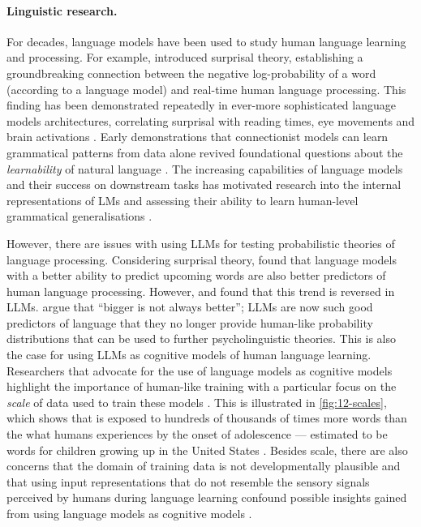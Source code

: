 \paragraph{Linguistic research.} For decades, language models have been used to study human language learning and processing. For example, \citet{hale-2001-probabilistic} introduced surprisal theory, establishing a groundbreaking connection between the negative log-probability of a word (according to a language model) and real-time human language processing. This finding has been demonstrated repeatedly in ever-more sophisticated language models architectures, correlating surprisal with reading times, eye movements and brain activations \citep[e.g.][]{levy2008expectation, futrell2019neural, futrell2020lossy, schrimpf2021neural}. Early demonstrations that connectionist models can learn grammatical patterns from data alone \citep[e.g.,][]{elman1990finding, macdonald1994lexical} revived foundational questions about the \emph{learnability} of natural language \citep{gold1967language}. The increasing capabilities of language models and their success on downstream tasks has motivated research into the internal representations of LMs and assessing their ability to learn human-level grammatical generalisations \citep{hewitt-manning-2019-structural, hu-etal-2020-systematic, manning-2020-emergent}.

However, there are issues with using LLMs for testing probabilistic theories of language processing. Considering surprisal theory, \citet{wilcox2020predictive} found that language models with a better ability to predict upcoming words are also better predictors of human language processing. However, \citet{shain2024large} and \citet{oh2024frequency} found that this trend is reversed in LLMs. \citet{wilcox2025bigger} argue that ``bigger is not always better''; LLMs are now such good predictors of language that they no longer provide human-like probability distributions that can be used to further psycholinguistic theories. This is also the case for using LLMs as cognitive models of human language learning. Researchers that advocate for the use of language models as cognitive models highlight the importance of human-like training with a particular focus on the \emph{scale} of data used to train these models \citep{linzen-2020-accelerate,baroni-2022-proper,warstadt-2022-artificial,wilcox2025bigger}. This is illustrated in \cref{fig:12-scales}, which shows that \llamathree is exposed to hundreds of thousands of times more words than the what humans experiences by the onset of adolescence --- estimated to be  words for children growing up in the United States \citep{gilkerson2017mapping}. Besides scale, there are also concerns that the domain of training data is not developmentally plausible \citep{huebner-etal-2021-babyberta, warstadt-2023-babylm-findings} and that using input representations that do not resemble the sensory signals perceived by humans during language learning confound possible insights gained from using language models as cognitive models \citep{dupoux-2018-cognitive}. 

